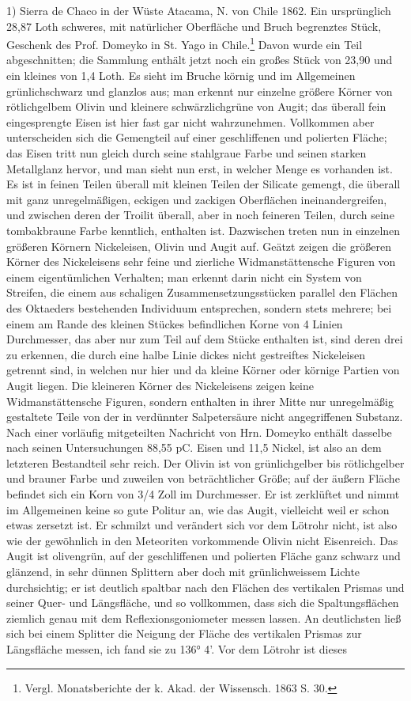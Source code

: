\documentclass[a4paper, 11pt, oneside]{article}
\begin{document}
1) Sierra de Chaco in der Wüste Atacama, N. von Chile 1862. Ein ursprünglich 28,87 Loth schweres, mit natürlicher Oberfläche und Bruch begrenztes Stück, Geschenk des Prof. Domeyko in St. Yago in Chile.\footnote{Vergl. Monatsberichte der k. Akad. der Wissensch. 1863 S. 30.} Davon wurde ein Teil abgeschnitten; die Sammlung enthält jetzt noch ein großes Stück von 23,90 und ein kleines von 1,4 Loth. Es sieht im Bruche körnig und im Allgemeinen grünlichschwarz und glanzlos aus; man erkennt nur einzelne größere Körner von rötlichgelbem Olivin und kleinere schwärzlichgrüne von Augit; das überall fein eingesprengte Eisen ist hier fast gar nicht wahrzunehmen. Vollkommen aber unterscheiden sich die Gemengteil auf einer geschliffenen und polierten Fläche; das Eisen tritt nun gleich durch seine stahlgraue Farbe und seinen starken Metallglanz hervor, und man sieht nun erst, in welcher Menge es vorhanden ist. Es ist in feinen Teilen überall mit kleinen Teilen der Silicate gemengt, die überall mit ganz unregelmäßigen, eckigen und zackigen Oberflächen ineinandergreifen, und zwischen deren der Troilit überall, aber in noch feineren Teilen, durch seine tombakbraune Farbe kenntlich, enthalten ist. Dazwischen treten nun in einzelnen größeren Körnern Nickeleisen, Olivin und Augit auf. Geätzt zeigen die größeren Körner des Nickeleisens sehr feine und zierliche Widmanstättensche Figuren von einem eigentümlichen Verhalten; man erkennt darin nicht ein System von Streifen, die einem aus schaligen Zusammensetzungsstücken parallel den Flächen des Oktaeders bestehenden Individuum entsprechen, sondern stets mehrere; bei einem am Rande des kleinen Stückes befindlichen Korne von 4 Linien Durchmesser, das aber nur zum Teil auf dem Stücke enthalten ist, sind deren drei zu erkennen, die durch eine halbe Linie dickes nicht gestreiftes Nickeleisen getrennt sind, in welchen nur hier und da kleine Körner oder körnige Partien von Augit liegen. Die kleineren Körner des Nickeleisens zeigen keine Widmanstättensche Figuren, sondern enthalten in ihrer Mitte nur unregelmäßig gestaltete Teile von der in verdünnter Salpetersäure nicht angegriffenen Substanz. Nach einer vorläufig mitgeteilten Nachricht von Hrn. Domeyko enthält dasselbe nach seinen Untersuchungen 88,55 pC. Eisen und 11,5 Nickel, ist also an dem letzteren Bestandteil sehr reich. Der Olivin ist von grünlichgelber bis rötlichgelber und brauner Farbe und zuweilen von beträchtlicher Größe; auf der äußern Fläche befindet sich ein Korn von 3/4 Zoll im Durchmesser. Er ist zerklüftet und nimmt im Allgemeinen keine so gute Politur an, wie das Augit, vielleicht weil er schon etwas zersetzt ist. Er schmilzt und verändert sich vor dem Lötrohr nicht, ist also wie der gewöhnlich in den Meteoriten vorkommende Olivin nicht Eisenreich. Das Augit ist olivengrün, auf der geschliffenen und polierten Fläche ganz schwarz und glänzend, in sehr dünnen Splittern aber doch mit grünlichweissem Lichte durchsichtig; er ist deutlich spaltbar nach den Flächen des vertikalen Prismas und seiner Quer- und Längsfläche, und so vollkommen, dass sich die Spaltungsflächen ziemlich genau mit dem Reflexionsgoniometer messen lassen. An deutlichsten ließ sich bei einem Splitter die Neigung der Fläche des vertikalen Prismas zur Längsfläche messen, ich fand sie zu 136° 4’. Vor dem Lötrohr ist dieses 
\end{document}
